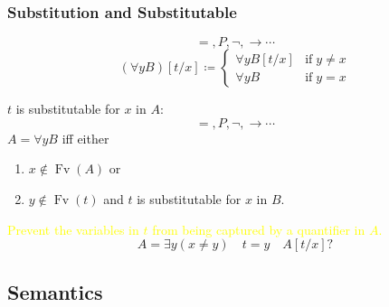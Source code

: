\documentclass[UTF8,aspectratio=43,11pt,colorlinks,compress,openany]{beamer}%
\begin{document}
\begin{frame}\frametitle{Substitution and Substitutable}
\setlength\abovedisplayskip{0pt}
\setlength\belowdisplayskip{0pt}
	\begin{definition}
		\[=,P,\neg,\to\cdots\]
		\[(\forall y B)[t/x]\coloneqq 
			\begin{cases}
			\forall y B[t/x] &\text{if}\;y\ne x\\
			\forall y B &\text{if}\;y=x
			\end{cases}\]
	\end{definition}
	\begin{definition}[Substitutable]
		$t$ is substitutable for $x$ in $A$:
		\[=,P,\neg,\to\cdots\]
		$A=\forall y B$ iff either
		\begin{enumerate}
			\item $x\notin \operatorname{Fv}(A)$ or
			\item $y\notin \operatorname{Fv}(t)$ and $t$ is substitutable for $x$ in $B$.
		\end{enumerate}
	\end{definition}
\textcolor{yellow}{Prevent the variables in $t$ from being captured by a quantifier in $A$.}
	\[A=\exists y(x\ne y)\quad t=y\quad A[t/x]?\]
\end{frame}

\subsection{Semantics}
\end{document}
